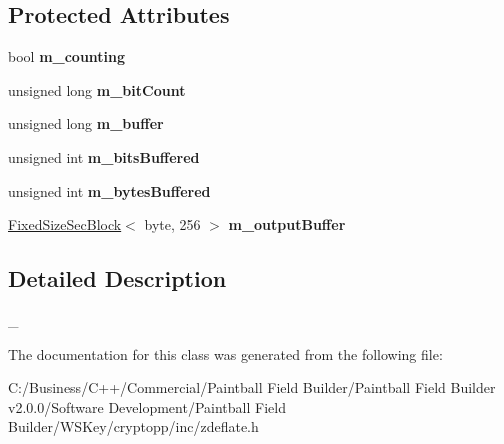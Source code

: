 \subsection*{Protected Attributes}
\begin{DoxyCompactItemize}
\item 
\hypertarget{class_low_first_bit_writer_a58294b1ee6610ff1ac6ead1beb31bace}{
bool {\bfseries m\_\-counting}}
\label{class_low_first_bit_writer_a58294b1ee6610ff1ac6ead1beb31bace}

\item 
\hypertarget{class_low_first_bit_writer_a98734af15461d4d8783b822efb1af291}{
unsigned long {\bfseries m\_\-bitCount}}
\label{class_low_first_bit_writer_a98734af15461d4d8783b822efb1af291}

\item 
\hypertarget{class_low_first_bit_writer_a0df2a5478042587afd61c8f2c0c04b59}{
unsigned long {\bfseries m\_\-buffer}}
\label{class_low_first_bit_writer_a0df2a5478042587afd61c8f2c0c04b59}

\item 
\hypertarget{class_low_first_bit_writer_a20da2a4de9640ac6f3b785a7fff56c60}{
unsigned int {\bfseries m\_\-bitsBuffered}}
\label{class_low_first_bit_writer_a20da2a4de9640ac6f3b785a7fff56c60}

\item 
\hypertarget{class_low_first_bit_writer_a75a39e9548b284609320ab615289040d}{
unsigned int {\bfseries m\_\-bytesBuffered}}
\label{class_low_first_bit_writer_a75a39e9548b284609320ab615289040d}

\item 
\hypertarget{class_low_first_bit_writer_aff9c2060798e6c750768b3112721b522}{
\hyperlink{class_fixed_size_sec_block}{FixedSizeSecBlock}$<$ byte, 256 $>$ {\bfseries m\_\-outputBuffer}}
\label{class_low_first_bit_writer_aff9c2060798e6c750768b3112721b522}

\end{DoxyCompactItemize}


\subsection{Detailed Description}
\_\- 

The documentation for this class was generated from the following file:\begin{DoxyCompactItemize}
\item 
C:/Business/C++/Commercial/Paintball Field Builder/Paintball Field Builder v2.0.0/Software Development/Paintball Field Builder/WSKey/cryptopp/inc/zdeflate.h\end{DoxyCompactItemize}

